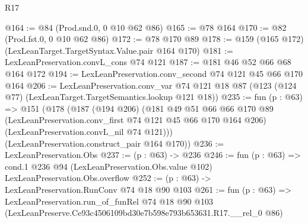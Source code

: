 \begin{lexlean}{R17}
\begin{coremodule}
@164 := @84 (Prod.snd.{0, 0} @10 @62 @86)
@165 := @78 @164
@170 := @82 (Prod.fst.{0, 0} @10 @62 @86)
@172 := @78 @170 @89
@178 := @159 (@165 @172) (LexLeanTarget.TargetSyntax.Value.pair @164 @170)
@181 := LexLeanPreservation.convL_cons @74 @121
@187 := @181 @46 @52 @66 @68 @164 @172
@194 := LexLeanPreservation.conv_second @74 @121 @45 @66 @170 @164
@206 := LexLeanPreservation.conv_var
    @74
    @121
    @18
    @87
    (@123 (@124 @77) (LexLeanTarget.TargetSemantics.lookup @121 @18))
@235 := fun (p : @63) =>
  @151
    (@178
      (@187
        (@194 @206)
        (@181
          @49
          @51
          @66
          @66
          @170
          @89
          (LexLeanPreservation.conv_first @74 @121 @45 @66 @170 @164 @206)
          (LexLeanPreservation.convL_nil @74 @121)))
      (LexLeanPreservation.construct_pair @164 @170))
@236 := LexLeanPreservation.Obs
@237 := (p : @63) -> @236
@246 := fun (p : @63) =>
  cond.{1} @236 @94 (LexLeanPreservation.Obs.value @102) LexLeanPreservation.Obs.overflow
@252 := (p : @63) -> LexLeanPreservation.RunConv @74 @18 @90 @103
@261 := fun (p : @63) =>
  LexLeanPreservation.run_of_funRel
    @74
    @18
    @90
    @103
    (LexLeanPreserve.Ce93c4506109bd30e7b598e793b653631.R17.__rel_0 @86)
\end{coremodule}
\end{lexlean}
